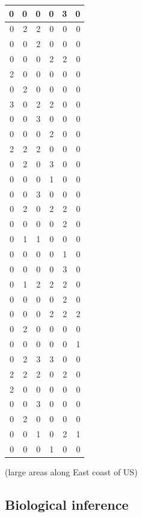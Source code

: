 \documentclass[
  12pt,
]{krantz}
\begin{document}
\begin{tabular}{r|r|r|r|r|r}
\hline
0 & 0 & 0 & 0 & 3 & 0\\
\hline
0 & 2 & 2 & 0 & 0 & 0\\
\hline
0 & 0 & 2 & 0 & 0 & 0\\
\hline
0 & 0 & 0 & 2 & 2 & 0\\
\hline
2 & 0 & 0 & 0 & 0 & 0\\
\hline
0 & 2 & 0 & 0 & 0 & 0\\
\hline
3 & 0 & 2 & 2 & 0 & 0\\
\hline
0 & 0 & 3 & 0 & 0 & 0\\
\hline
0 & 0 & 0 & 2 & 0 & 0\\
\hline
2 & 2 & 2 & 0 & 0 & 0\\
\hline
0 & 2 & 0 & 3 & 0 & 0\\
\hline
0 & 0 & 0 & 1 & 0 & 0\\
\hline
0 & 0 & 3 & 0 & 0 & 0\\
\hline
0 & 2 & 0 & 2 & 2 & 0\\
\hline
0 & 0 & 0 & 0 & 2 & 0\\
\hline
0 & 1 & 1 & 0 & 0 & 0\\
\hline
0 & 0 & 0 & 0 & 1 & 0\\
\hline
0 & 0 & 0 & 0 & 3 & 0\\
\hline
0 & 1 & 2 & 2 & 2 & 0\\
\hline
0 & 0 & 0 & 0 & 2 & 0\\
\hline
0 & 0 & 0 & 2 & 2 & 2\\
\hline
0 & 2 & 0 & 0 & 0 & 0\\
\hline
0 & 0 & 0 & 0 & 0 & 1\\
\hline
0 & 2 & 3 & 3 & 0 & 0\\
\hline
2 & 2 & 2 & 0 & 2 & 0\\
\hline
2 & 0 & 0 & 0 & 0 & 0\\
\hline
0 & 0 & 3 & 0 & 0 & 0\\
\hline
0 & 2 & 0 & 0 & 0 & 0\\
\hline
0 & 0 & 1 & 0 & 2 & 1\\
\hline
0 & 0 & 0 & 1 & 0 & 0\\
\hline
\end{tabular}

(large areas along East coast of US)

\hypertarget{biological-inference}{%
\subsection{Biological inference}\label{biological-inference}}
\end{document}
